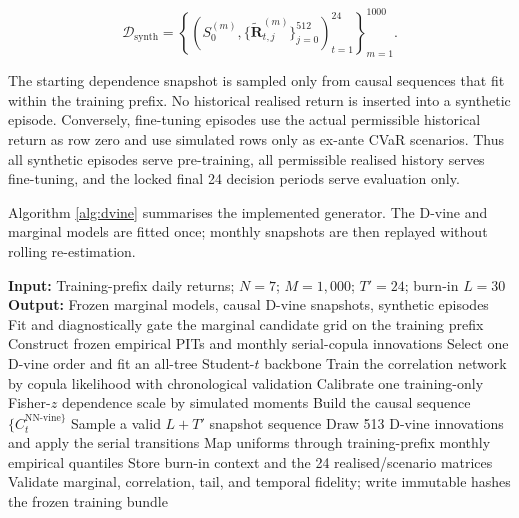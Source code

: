 \begin{equation}
\mathcal D_{\mathrm{synth}}=
\left\{\left(S^{(m)}_{0},\{\widetilde{\boldsymbol R}^{(m)}_{t,j}\}_{j=0}^{512}\right)_{t=1}^{24}\right\}_{m=1}^{1000}.
\label{eq:synth_paths}
\end{equation}

The starting dependence snapshot is sampled only from causal sequences that fit within the training prefix. No historical realised return is inserted into a synthetic episode. Conversely, fine-tuning episodes use the actual permissible historical return as row zero and use simulated rows only as ex-ante CVaR scenarios. Thus all synthetic episodes serve pre-training, all permissible realised history serves fine-tuning, and the locked final 24 decision periods serve evaluation only.

Algorithm \ref{alg:dvine} summarises the implemented generator. The D-vine and marginal models are fitted once; monthly snapshots are then replayed without rolling re-estimation.

\begin{algorithm}[H]
\caption{Neural D-Vine Estimation and Synthetic Episode Generation}
\label{alg:dvine}
\begin{algorithmic}[1]
\STATE \textbf{Input:} Training-prefix daily returns; $N=7$; $M=1{,}000$; $T'=24$; burn-in $L=30$
\STATE \textbf{Output:} Frozen marginal models, causal D-vine snapshots, synthetic episodes
\STATE Fit and diagnostically gate the marginal candidate grid on the training prefix
\STATE Construct frozen empirical PITs and monthly serial-copula innovations
\STATE Select one D-vine order and fit an all-tree Student-$t$ backbone
    \STATE Train the correlation network by copula likelihood with chronological validation
\ENDFOR
\STATE Calibrate one training-only Fisher-$z$ dependence scale by simulated moments
\STATE Build the causal sequence $\{C_t^{\mathrm{NN\mbox{-}vine}\}}$
    \STATE Sample a valid $L+T'$ snapshot sequence
        \STATE Draw 513 D-vine innovations and apply the serial transitions
        \STATE Map uniforms through training-prefix monthly empirical quantiles
    \ENDFOR
    \STATE Store burn-in context and the 24 realised/scenario matrices
\ENDFOR
\STATE Validate marginal, correlation, tail, and temporal fidelity; write immutable hashes
\RETURN the frozen training bundle
\end{algorithmic}
\end{algorithm}







